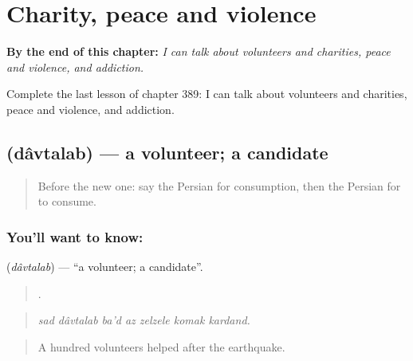 
\chapter{Charity, peace and violence}
\label{ch:fa-charity-peace-and-violence}

\begin{chapteropening}
\textbf{By the end of this chapter:} \emph{I can talk about volunteers and charities, peace and violence, and addiction.}

Complete the last lesson of chapter 389: I can talk about volunteers and charities, peace and violence, and addiction.
\end{chapteropening}

\section[\texorpdfstring{\fa{داوطلب} (dâvtalab)}{داوطلب (dâvtalab)}]{ (dâvtalab) — a volunteer; a candidate}

\label{lesson:FA-C389-davtalab}



\begin{quote}
Before the new one: say the Persian for consumption, then the Persian for to consume.
\end{quote}

\subsection*{You'll want to know: }
\textbf{} (\emph{dâvtalab}) — \textquotedblleft{}a volunteer; a candidate\textquotedblright{}.

\begin{quote}
      .
\end{quote}

\begin{quote}
\emph{sad dâvtalab ba'd az zelzele komak kardand.}
\end{quote}

\begin{quote}
A hundred volunteers helped after the earthquake.
\end{quote}

